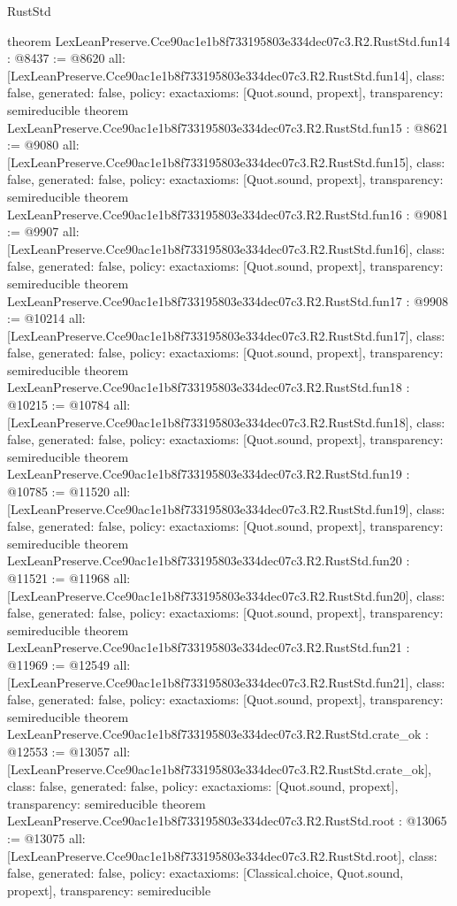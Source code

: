 \begin{lexlean}{RustStd}
\begin{coremodule}
{}
theorem LexLeanPreserve.Cce90ac1e1b8f733195803e334dec07c3.R2.RustStd.fun14 : @8437 := @8620 {
  all: [LexLeanPreserve.Cce90ac1e1b8f733195803e334dec07c3.R2.RustStd.fun14],
  class: false,
  generated: false,
  policy: exact{axioms: [Quot.sound, propext]},
  transparency: semireducible
}
theorem LexLeanPreserve.Cce90ac1e1b8f733195803e334dec07c3.R2.RustStd.fun15 : @8621 := @9080 {
  all: [LexLeanPreserve.Cce90ac1e1b8f733195803e334dec07c3.R2.RustStd.fun15],
  class: false,
  generated: false,
  policy: exact{axioms: [Quot.sound, propext]},
  transparency: semireducible
}
theorem LexLeanPreserve.Cce90ac1e1b8f733195803e334dec07c3.R2.RustStd.fun16 : @9081 := @9907 {
  all: [LexLeanPreserve.Cce90ac1e1b8f733195803e334dec07c3.R2.RustStd.fun16],
  class: false,
  generated: false,
  policy: exact{axioms: [Quot.sound, propext]},
  transparency: semireducible
}
theorem LexLeanPreserve.Cce90ac1e1b8f733195803e334dec07c3.R2.RustStd.fun17 : @9908 := @10214 {
  all: [LexLeanPreserve.Cce90ac1e1b8f733195803e334dec07c3.R2.RustStd.fun17],
  class: false,
  generated: false,
  policy: exact{axioms: [Quot.sound, propext]},
  transparency: semireducible
}
theorem LexLeanPreserve.Cce90ac1e1b8f733195803e334dec07c3.R2.RustStd.fun18 : @10215 := @10784 {
  all: [LexLeanPreserve.Cce90ac1e1b8f733195803e334dec07c3.R2.RustStd.fun18],
  class: false,
  generated: false,
  policy: exact{axioms: [Quot.sound, propext]},
  transparency: semireducible
}
theorem LexLeanPreserve.Cce90ac1e1b8f733195803e334dec07c3.R2.RustStd.fun19 : @10785 := @11520 {
  all: [LexLeanPreserve.Cce90ac1e1b8f733195803e334dec07c3.R2.RustStd.fun19],
  class: false,
  generated: false,
  policy: exact{axioms: [Quot.sound, propext]},
  transparency: semireducible
}
theorem LexLeanPreserve.Cce90ac1e1b8f733195803e334dec07c3.R2.RustStd.fun20 : @11521 := @11968 {
  all: [LexLeanPreserve.Cce90ac1e1b8f733195803e334dec07c3.R2.RustStd.fun20],
  class: false,
  generated: false,
  policy: exact{axioms: [Quot.sound, propext]},
  transparency: semireducible
}
theorem LexLeanPreserve.Cce90ac1e1b8f733195803e334dec07c3.R2.RustStd.fun21 : @11969 := @12549 {
  all: [LexLeanPreserve.Cce90ac1e1b8f733195803e334dec07c3.R2.RustStd.fun21],
  class: false,
  generated: false,
  policy: exact{axioms: [Quot.sound, propext]},
  transparency: semireducible
}
theorem LexLeanPreserve.Cce90ac1e1b8f733195803e334dec07c3.R2.RustStd.crate_ok : @12553 := @13057 {
  all: [LexLeanPreserve.Cce90ac1e1b8f733195803e334dec07c3.R2.RustStd.crate_ok],
  class: false,
  generated: false,
  policy: exact{axioms: [Quot.sound, propext]},
  transparency: semireducible
}
theorem LexLeanPreserve.Cce90ac1e1b8f733195803e334dec07c3.R2.RustStd.root : @13065 := @13075 {
  all: [LexLeanPreserve.Cce90ac1e1b8f733195803e334dec07c3.R2.RustStd.root],
  class: false,
  generated: false,
  policy: exact{axioms: [Classical.choice, Quot.sound, propext]},
  transparency: semireducible
}


\end{coremodule}
\end{lexlean}

